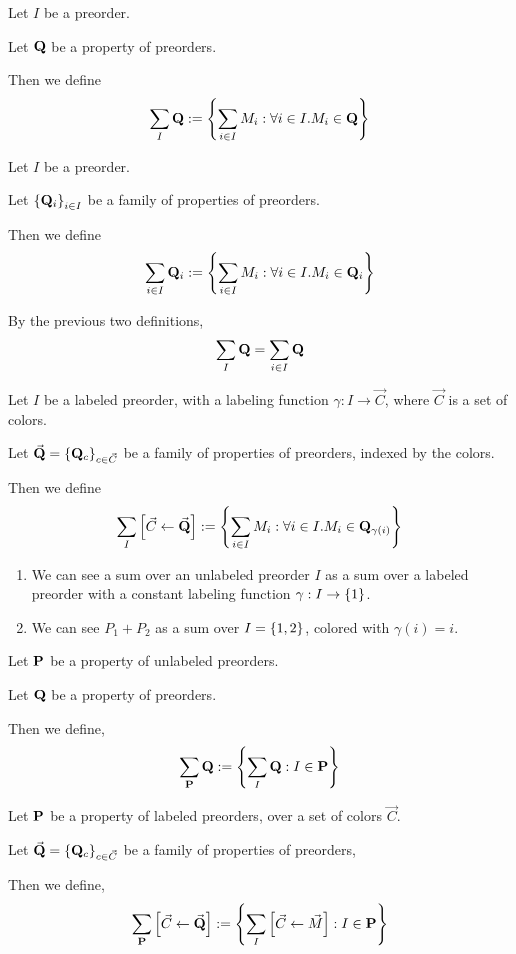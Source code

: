 \begin{definition}
  Let $I$ be a preorder.

  Let $\mathbf{Q}$ be a property of preorders.

  Then we define
  \[
    \sum_{I}{\mathbf{Q}} := \left\{ {\sum_{i \in I}{M_i} : \forall i \in I. M_i \in \mathbf{Q}} \right\}
  \]
\end{definition}


\begin{definition}
  Let $I$ be a preorder.

  Let $\left\{ {\mathbf{Q}_i} \right\}_{i \in I}$ be a family of properties of preorders.

  Then we define
  \[
    \sum_{i \in I}{\mathbf{Q}_i} := \left\{ {\sum_{i \in I}{M_i} : \forall i \in I. M_i \in \mathbf{Q}_i} \right\}
  \]
\end{definition}

\begin{note}
  By the previous two definitions,
  \[
    \sum_{I}{\mathbf{Q}} = \sum_{i \in I}{\mathbf{Q}}
  \]
\end{note}

\begin{definition}
  Let $I$ be a labeled preorder, with a labeling function $\gamma : I \to \vec{C}$,
  where $\vec{C}$ is a set of colors.

  Let $\vec{\mathbf{Q}} = \left\{ {\mathbf{Q}_c} \right\}_{c \in \vec{C}}$ be a family of properties of preorders,
  indexed by the colors.

  Then we define
  \[
    \sum_{I} \left[ {{\vec{C}} \leftarrow {\vec{\mathbf{Q}}}} \right] := \left\{ {\sum_{i \in I}{M_i} : \forall i \in I. M_i \in \mathbf{Q}_{\gamma(i)}} \right\}
  \]
\end{definition}

\begin{notes}
  \begin{enumerate}
    \item We can see a sum over an unlabeled preorder $I$ as a sum over a labeled preorder
          with a constant labeling function $\gamma : I \to \left\{ {1} \right\}$.
    \item We can see $P_1 + P_2$ as a sum over $I = \left\{ {1, 2} \right\}$, colored
          with $\gamma(i) = i$.
  \end{enumerate}
\end{notes}

\begin{definition}
  Let $\mathbf{P}$ be a property of unlabeled preorders.

  Let $\mathbf{Q}$ be a property of preorders.

  Then we define,
  \[
    \sum_{\mathbf{P}}{\mathbf{Q}} := \left\{ {\sum_{I}{\mathbf{Q}} : I \in \mathbf{P}} \right\}
  \]
\end{definition}

\begin{definition}
  Let $\mathbf{P}$ be a property of labeled preorders, over a set of colors $\vec{C}$.

  Let $\vec{\mathbf{Q}} = \left\{ {\mathbf{Q}_c} \right\}_{c \in \vec{C}}$ be a family of properties of preorders,

  Then we define,
  \[
    \sum_{\mathbf{P}} \left[ {{\vec{C}} \leftarrow {\vec{\mathbf{Q}}}} \right] := \left\{ {\sum_{I} \left[ {{\vec{C}} \leftarrow {\vec{M}}} \right] : I \in \mathbf{P}} \right\}
  \]
\end{definition}